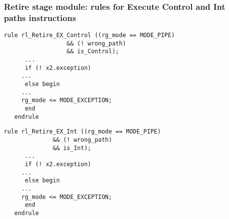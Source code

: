 
\begin{frame}[fragile]
\frametitle{Retire stage module: rules for Execute Control and Int paths instructions}

\footnotesize

\begin{minipage}{0.725\textwidth}\scriptsize
\begin{Verbatim}[frame=single, label=From Code/src\_Fife/S5\_Retire.bsv]
   rule rl_Retire_EX_Control ((rg_mode == MODE_PIPE)
			      && (! wrong_path)
			      && is_Control);
      ...
      if (! x2.exception)
	 ...
      else begin
	 ...
	 rg_mode <= MODE_EXCEPTION;
      end
   endrule
\end{Verbatim}
\end{minipage}

\vspace{2ex}

\begin{minipage}{0.725\textwidth}\scriptsize
\begin{Verbatim}[frame=single, label=From Code/src\_Fife/S5\_Retire.bsv]
   rule rl_Retire_EX_Int ((rg_mode == MODE_PIPE)
			  && (! wrong_path)
			  && is_Int);
      ...
      if (! x2.exception)
	 ...
      else begin
	 ...
	 rg_mode <= MODE_EXCEPTION;
      end
   endrule
\end{Verbatim}
\end{minipage}

\end{frame}



